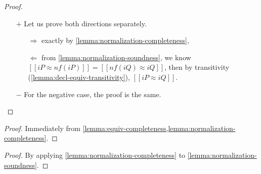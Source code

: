 \lemmaDeclEquivAlg*
\begin{proof} \hfill
  \begin{itemize}
    \item[$+$] Let us prove both directions separately.
    \begin{itemize}
      \item[$\Rightarrow$] 
        exactly by \cref{lemma:normalization-completeness},
      \item[$\Leftarrow$] 
        from \cref{lemma:normalization-soundness}, we know
        $[[iP ≈ nf(iP)]] = [[nf(iQ) ≈ iQ]]$, then by transitivity (\cref{lemma:decl-equiv-transitivity}),
        $[[iP ≈ iQ]]$.
    \end{itemize}
    \item[$-$] For the negative case, the proof is the same.
  \end{itemize}
\end{proof}

\corollaryNfCompleteWrtSubtEquiv*
\begin{proof}
  Immediately from \cref{lemma:equiv-completeness,lemma:normalization-completeness}.
\end{proof}


\lemmaNormIdemp*
\begin{proof}
  By applying \cref{lemma:normalization-completeness} to \cref{lemma:normalization-soundness}.
\end{proof}

